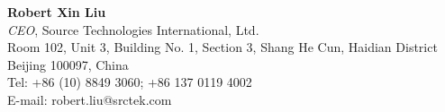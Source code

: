 \documentclass[letterpaper,11pt]{article}
\begin{document}
\vspace{0.2in}%
\textbf{Robert Xin Liu}\\
\textit{CEO}, Source Technologies International, Ltd.\\
Room 102, Unit 3, Building No. 1, Section 3, Shang He Cun, Haidian District\\
Beijing 100097, China\\
Tel: +86 (10) 8849 3060; +86 137 0119 4002\\
E-mail: robert.liu@srctek.com\\



%
%

\end{document}
